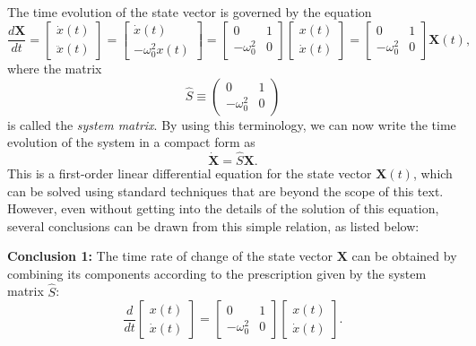 \documentclass[12pt]{article}
\begin{document}
The time evolution of the state vector is governed by the equation
\begin{equation}
    \frac{d\mathbf{X}}{dt}
    =\begin{bmatrix}\dot{x}(t)\\\ddot{x}(t)\end{bmatrix}
    =\begin{bmatrix}\dot{x}(t)\\-\omega_0^2x(t)\end{bmatrix}
    =\begin{bmatrix}0&1\\-\omega_0^2&0\end{bmatrix}
    \begin{bmatrix}x(t)\\\dot{x}(t)\end{bmatrix}
    =\begin{bmatrix}0&1\\-\omega_0^2&0\end{bmatrix}\mathbf{X}(t),
\end{equation}
where the matrix
\begin{equation}
    \hat{S} \equiv \begin{pmatrix}0&1\\-\omega_0^2&0\end{pmatrix}
\end{equation}
is called the \emph{system matrix}. By using this terminology, we can now write the time evolution of the system in a compact form as
\begin{equation}
    \dot{\mathbf{X}} = \hat{S}\mathbf{X}.
\end{equation}
This is a first-order linear differential equation for the state vector $\mathbf{X}(t)$, which can be solved using standard techniques that are beyond the scope of this text. However, even without getting into the details of the solution of this equation, several conclusions can be drawn from this simple relation, as listed below:

\textbf{Conclusion 1:} The time rate of change of the state vector $\mathbf{X}$ can be obtained by combining its components according to the prescription given by the system matrix $\hat{S}$:
\begin{equation}
    \frac{d}{dt}\begin{bmatrix}x(t)\\\dot{x}(t)\end{bmatrix}
    =\begin{bmatrix}0&1\\-\omega_0^2&0\end{bmatrix}
    \begin{bmatrix}x(t)\\\dot{x}(t)\end{bmatrix}.
\end{equation}
\end{document}
